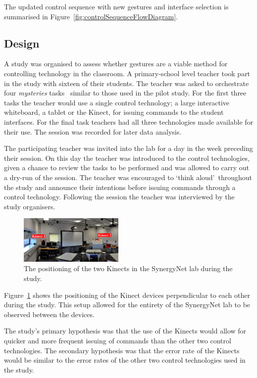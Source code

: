\documentclass[link]{IWCOMP}
\begin{document}
The updated control sequence with new gestures and interface selection is summarised in Figure~\ref{fig:controlSequenceFlowDiagram}.

\subsection{Design}
\label{subsec:studyDesign}

A study was organised to assess whether gestures are a viable method for controlling technology in the classroom.
A primary-school level teacher took part in the study with sixteen of their students.
The teacher was asked to orchestrate four \textit{mysteries} tasks~\cite{AlAgha2010} similar to those used in the pilot study.
For the first three tasks the teacher would use a single control technology; a large interactive whiteboard, a tablet or the Kinect, for issuing commands to the student interfaces.
For the final task teachers had all three technologies made available for their use.
The session was recorded for later data analysis.

The participating teacher was invited into the lab for a day in the week preceding their session.
On this day the teacher was introduced to the control technologies, given a chance to review the tasks to be performed and was allowed to carry out a dry-run of the session.
The teacher was encouraged to \lq think aloud\rq\ throughout the study and announce their intentions before issuing commands through a control technology.
Following the session the teacher was interviewed by the study organisers.

\begin{figure}[h]
  \centering
  \includegraphics[width=0.45\textwidth]{figures/multiple_kinect_setup.png}
  \caption{The positioning of the two Kinects in the SynergyNet lab during the study.}
  \label{fig:kinectSetup}
\end{figure}

Figure~\ref{fig:kinectSetup} shows the positioning of the Kinect devices perpendicular to each other during the study.
This setup allowed for the entirety of the SynergyNet lab to be observed between the devices.

The study's primary hypothesis was that the use of the Kinects would allow for quicker and more frequent issuing of commands than the other two control technologies.
The secondary hypothesis was that the error rate of the Kinects would be similar to the error rates of the other two control technologies used in the study.
\end{document}
